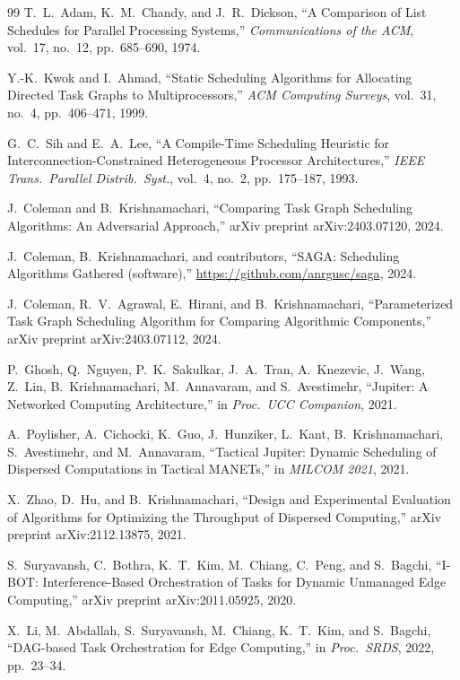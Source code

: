 \documentclass[conference]{IEEEtran}
\begin{document}
\begin{thebibliography}{99}
T.~L.~Adam, K.~M.~Chandy, and J.~R.~Dickson,
``A Comparison of List Schedules for Parallel Processing Systems,''
\emph{Communications of the ACM},
vol.~17, no.~12, pp.~685--690, 1974.

Y.-K.~Kwok and I.~Ahmad,
``Static Scheduling Algorithms for Allocating Directed Task Graphs to
Multiprocessors,''
\emph{ACM Computing Surveys},
vol.~31, no.~4, pp.~406--471, 1999.

G.~C.~Sih and E.~A.~Lee,
``A Compile-Time Scheduling Heuristic for Interconnection-Constrained
Heterogeneous Processor Architectures,''
\emph{IEEE Trans.\ Parallel Distrib.\ Syst.},
vol.~4, no.~2, pp.~175--187, 1993.

J.~Coleman and B.~Krishnamachari,
``Comparing Task Graph Scheduling Algorithms: An Adversarial Approach,''
arXiv preprint arXiv:2403.07120, 2024.

J.~Coleman, B.~Krishnamachari, and contributors,
``{SAGA}: Scheduling Algorithms Gathered (software),''
\url{https://github.com/anrgusc/saga}, 2024.

J.~Coleman, R.~V.~Agrawal, E.~Hirani, and B.~Krishnamachari,
``Parameterized Task Graph Scheduling Algorithm for Comparing Algorithmic
Components,''
arXiv preprint arXiv:2403.07112, 2024.

P.~Ghosh, Q.~Nguyen, P.~K.~Sakulkar, J.~A.~Tran, A.~Knezevic, J.~Wang,
Z.~Lin, B.~Krishnamachari, M.~Annavaram, and S.~Avestimehr,
``Jupiter: A Networked Computing Architecture,''
in \emph{Proc.\ UCC Companion}, 2021.

A.~Poylisher, A.~Cichocki, K.~Guo, J.~Hunziker, L.~Kant,
B.~Krishnamachari, S.~Avestimehr, and M.~Annavaram,
``Tactical Jupiter: Dynamic Scheduling of Dispersed Computations in
Tactical MANETs,''
in \emph{MILCOM 2021}, 2021.

X.~Zhao, D.~Hu, and B.~Krishnamachari,
``Design and Experimental Evaluation of Algorithms for Optimizing the
Throughput of Dispersed Computing,''
arXiv preprint arXiv:2112.13875, 2021.

S.~Suryavansh, C.~Bothra, K.~T.~Kim, M.~Chiang, C.~Peng, and S.~Bagchi,
``{I-BOT}: Interference-Based Orchestration of Tasks for Dynamic Unmanaged
Edge Computing,''
arXiv preprint arXiv:2011.05925, 2020.

X.~Li, M.~Abdallah, S.~Suryavansh, M.~Chiang, K.~T.~Kim, and S.~Bagchi,
``DAG-based Task Orchestration for Edge Computing,''
in \emph{Proc.\ SRDS}, 2022, pp.~23--34.


\end{thebibliography}
\end{document}
